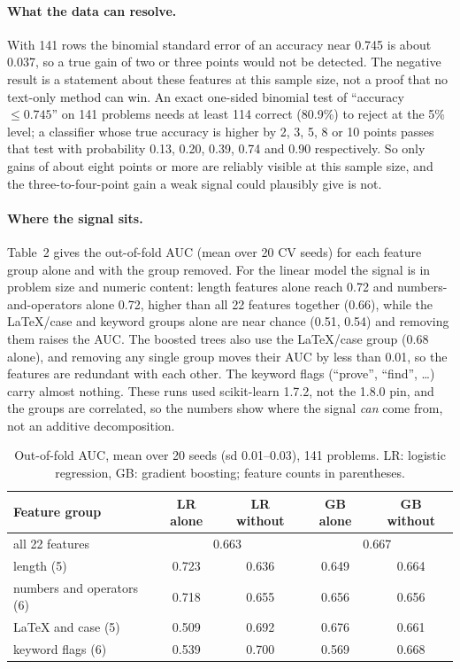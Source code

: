 \documentclass{article}
\begin{document}
\paragraph{What the data can resolve.} With 141 rows the binomial standard error of an accuracy near 0.745 is about 0.037, so a true gain of two or three points would not be detected.
The negative result is a statement about these features at this sample size, not a proof that no text-only method can win.
An exact one-sided binomial test of ``accuracy $\le0.745$'' on 141 problems needs at least 114 correct (80.9\%) to reject at the 5\% level; a classifier whose true accuracy is higher by 2, 3, 5, 8 or 10 points passes that test with probability 0.13, 0.20, 0.39, 0.74 and 0.90 respectively.
So only gains of about eight points or more are reliably visible at this sample size, and the three-to-four-point gain a weak signal could plausibly give is not.

\paragraph{Where the signal sits.} Table~2 gives the out-of-fold AUC (mean over 20 CV seeds) for each feature group alone and with the group removed.
For the linear model the signal is in problem size and numeric content: length features alone reach 0.72 and numbers-and-operators alone 0.72, higher than all 22 features together (0.66), while the LaTeX/case and keyword groups alone are near chance (0.51, 0.54) and removing them raises the AUC.
The boosted trees also use the LaTeX/case group (0.68 alone), and removing any single group moves their AUC by less than 0.01, so the features are redundant with each other.
The keyword flags (``prove'', ``find'', \dots) carry almost nothing. These runs used scikit-learn 1.7.2, not the 1.8.0 pin, and the groups are correlated, so the numbers show where the signal \emph{can} come from, not an additive decomposition.

\begin{table}[h]
\centering\small
\begin{tabular}{@{}lcccc@{}}
\toprule
Feature group & LR alone & LR without & GB alone & GB without \\
\midrule
all 22 features & \multicolumn{2}{c}{0.663} & \multicolumn{2}{c}{0.667} \\
length (5) & 0.723 & 0.636 & 0.649 & 0.664 \\
numbers and operators (6) & 0.718 & 0.655 & 0.656 & 0.656 \\
LaTeX and case (5) & 0.509 & 0.692 & 0.676 & 0.661 \\
keyword flags (6) & 0.539 & 0.700 & 0.569 & 0.668 \\
\bottomrule
\end{tabular}
\caption{Out-of-fold AUC, mean over 20 seeds (sd 0.01--0.03), 141 problems. LR: logistic regression, GB: gradient boosting; feature counts in parentheses.}
\end{table}
\end{document}
